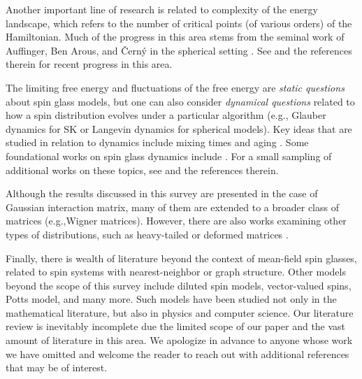 \documentclass[11pt]{article}
\numberwithin{equation}{section}
\theoremstyle{remark}
\begin{document}
Another important line of research is related to complexity of the energy landscape, which refers to the number of critical points (of various orders) of the Hamiltonian.  Much of the progress in this area stems from the seminal work of Auffinger, Ben Arous, and \v Cern\'y in the spherical setting \cite{Auffinger13,AuffingerBenArousCerny}.  See \cite{BenArousSubagZeitouni,AuffingerChen_energylandscape,Beliusetal_triviality,FyodorovLeDoussal2018,Subag_complexityspherical, HuangSellke_topologicaltrivialization,Kivimae_complexity, JT_2017lowtemp, Sellke_marginalstability,Fyodorov_complexity} and the references therein for recent progress in this area.

The limiting free energy and fluctuations of the free energy are \textit{static questions} about spin glass models, but one can also consider \textit{dynamical questions} related to how a spin distribution evolves under a particular algorithm (e.g., Glauber dynamics for SK or Langevin dynamics for spherical models).  Key ideas that are studied in relation to dynamics include mixing times \cite{BAJ_2018spectralgap,BAJ_2024,EldanKoehlerZeitouni_mixing, BB_LSI, GheissariJagannath_sphericaldynamics, AnariKoehlerVuong_localization} and aging \cite{BenArousGun, Gayrard_rem, CW_rem}. Some foundational works on spin glass dynamics include \cite{CugliandoloKurchan93, crisanti1993spherical, Grunwald96, BADG_CKdynamics}. For a small sampling of additional works on these topics, see \cite{Dandietal_dynamics, Sellke_langevin,BAGJ_sphericaldynamics,HuangSellke_optimizationspherical} and the references therein. 

Although the results discussed in this survey are presented in the case of Gaussian interaction matrix, many of them are extended to a broader class of matrices (e.g.,\@ Wigner matrices). However, there are also works examining other types of distributions, such as heavy-tailed or deformed matrices \cite{ChenKimSen25, KimLee24, LeeLi23}. 

Finally, there is wealth of literature beyond the context of mean-field spin glasses, related to spin systems with nearest-neighbor or graph structure.   Other models beyond the scope of this survey include diluted spin models, vector-valued spins, Potts model, and many more.  Such models have been studied not only in the mathematical literature, but also in physics and computer science.  Our literature review is inevitably incomplete due the limited scope of our paper and the vast amount of literature in this area.  We apologize in advance to anyone whose work we have omitted and welcome the reader to reach out with additional references that may be of interest.
\end{document}

